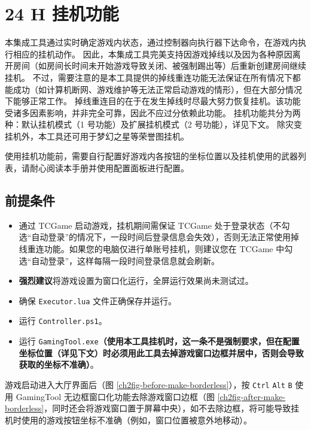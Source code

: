 \section{24 H 挂机功能}

本集成工具通过实时确定游戏内状态，通过控制器向执行器下达命令，在游戏内执行相应的挂机动作。
因此，本集成工具完美支持因游戏掉线以及因为各种原因离开房间（如房间长时间未开始游戏导致关闭、被强制踢出等）后重新创建房间继续挂机。
不过，需要注意的是本工具提供的掉线重连功能无法保证在所有情况下都能成功（如计算机断网、游戏维护等无法正常启动游戏的情形），但在大部分情况下能够正常工作。
掉线重连目的在于在发生掉线时尽最大努力恢复挂机。该功能受诸多因素影响，并非完全可靠，因此不应过分依赖此功能。
挂机功能共分为两种：默认挂机模式（1 号功能）及扩展挂机模式（2 号功能），详见下文。
除灾变挂机外，本工具还可用于梦幻之星等荣誉图挂机。

使用挂机功能前，需要自行配置好游戏内各按钮的坐标位置以及挂机使用的武器列表，请耐心阅读本手册并使用配置面板进行配置。

\subsection{前提条件}

\begin{itemize}

\item 通过 TCGame 启动游戏，挂机期间需保证 TCGame 处于登录状态（不勾选“自动登录”的情况下，一段时间后登录信息会失效），否则无法正常使用掉线重连功能。如果您的电脑仅进行单账号挂机，则建议您在 TCGame 中勾选“自动登录”，这样每隔一段时间登录信息就会刷新。

\item \textbf{\color{red}强烈建议}将游戏设置为窗口化运行，全屏运行效果尚未测试过。

\item 确保 \lstinline{Executor.lua} 文件正确保存并运行。

\item 运行 \lstinline{Controller.ps1}。

\item 运行 \lstinline{GamingTool.exe}\textbf{\color{red}（使用本工具挂机时，这一条不是强制要求，但在配置坐标位置（详见下文）时必须用此工具去掉游戏窗口边框并居中，否则会导致获取的坐标不准确）}。

\end{itemize}

游戏启动进入大厅界面后（图 \ref{ch2fig-before-make-borderless}），按 \lstinline{Ctrl} \lstinline{Alt} \lstinline{B} 使用 GamingTool 无边框窗口化功能去除游戏窗口边框（图 \ref{ch2fig-after-make-borderless}，同时还会将游戏窗口置于屏幕中央），如不去除边框，将可能导致挂机时使用的游戏按钮坐标不准确（例如，窗口位置被意外地移动）。

